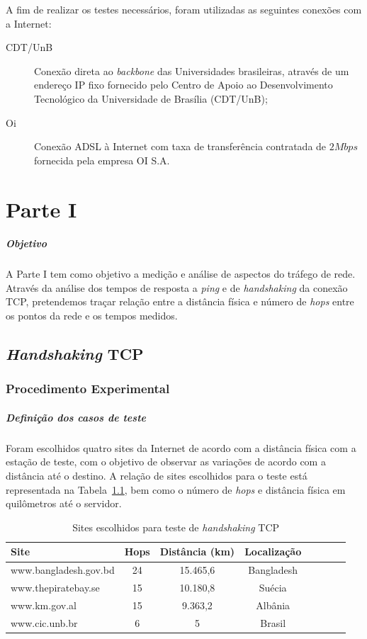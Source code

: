\documentclass[12pt,a4paper]{report}
\begin{document}
A fim de realizar os testes necessários, foram utilizadas as seguintes conexões com a Internet:

\begin{description}
\item[CDT/UnB] Conexão direta ao \textit{backbone} das Universidades brasileiras, através de um endereço IP fixo fornecido pelo Centro de Apoio ao Desenvolvimento Tecnológico da Universidade de Brasília (CDT/UnB);
\item[Oi] Conexão ADSL à Internet com taxa de transferência contratada de \(2Mbps\) fornecida pela empresa OI S.A.
\end{description}

\chapter{Parte I}

\paragraph{Objetivo} A Parte I tem como objetivo a medição e análise de aspectos do tráfego de rede. Através da análise dos tempos de resposta a \textit{ping} e de \textit{handshaking} da conexão TCP, pretendemos traçar relação entre a distância física e número de \textit{hops} entre os pontos da rede e os tempos medidos.

\section{\textit{Handshaking} TCP}

\subsection{Procedimento Experimental}

\paragraph{Definição dos casos de teste} Foram escolhidos quatro sites da Internet de acordo com a distância física com a estação de teste, com o objetivo de observar as variações de acordo com a distância até o destino. A relação de sites escolhidos para o teste está representada na Tabela~\ref{tab:siteshandshaking}, bem como o número de \textit{hops} e distância física em quilômetros até o servidor.

\begin{table}[h]
	\center
	\begin{tabular}{l*{6}{c}r}
	Site						& Hops	& Distância (km)	& Localização\\
	\hline
	www.bangladesh.gov.bd		& 24		& 15.465,6		& Bangladesh\\
	www.thepiratebay.se		& 15		& 10.180,8		& Suécia\\
	www.km.gov.al				& 15		& 9.363,2			& Albânia\\
	www.cic.unb.br				& 6		& 5				& Brasil\\
	\end{tabular}
	\caption{Sites escolhidos para teste de \textit{handshaking} TCP}
	\label{tab:siteshandshaking}
\end{table}
\end{document}
